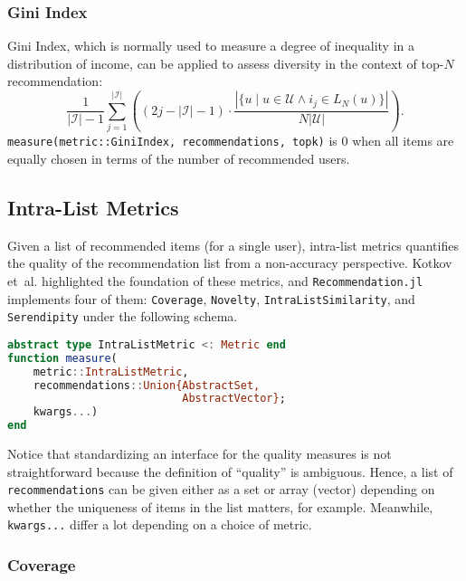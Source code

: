 \subsubsection{Gini Index}

Gini Index, which is normally used to measure a degree of inequality in a distribution of income, can be applied to assess diversity in the context of top-$N$ recommendation:
\begin{equation*}
\frac{1}{|\mathcal{I}| - 1} \sum_{j = 1}^{|\mathcal{I}|} \left( (2j - |\mathcal{I}| - 1) \cdot \frac{\left|\{u \mid u \in \mathcal{U} \wedge i_j \in L_N(u) \}\right|}{N |\mathcal{U}|} \right).
\end{equation*}
\texttt{measure(metric::GiniIndex, recommendations, topk)} is 0 when all items are equally chosen in terms of the number of recommended users.

\subsection{Intra-List Metrics}

Given a list of recommended items (for a single user), intra-list metrics quantifies the quality of the recommendation list from a non-accuracy perspective. Kotkov et~al. \cite{kotkov2016survey} highlighted the foundation of these metrics, and \texttt{Recommendation.jl} implements four of them: \texttt{Coverage}, \texttt{Novelty}, \texttt{IntraListSimilarity}, and \texttt{Serendipity} under the following schema.

\begin{lstlisting}[language = Julia]
abstract type IntraListMetric <: Metric end
function measure(
    metric::IntraListMetric, 
    recommendations::Union{AbstractSet, 
                           AbstractVector}; 
    kwargs...)
end
\end{lstlisting}

Notice that standardizing an interface for the quality measures is not straightforward because the definition of ``quality'' is ambiguous. Hence, a list of \texttt{recommendations} can be given either as a set or array (vector) depending on whether the uniqueness of items in the list matters, for example. Meanwhile, \texttt{kwargs...} differ a lot depending on a choice of metric.

\subsubsection{Coverage}


